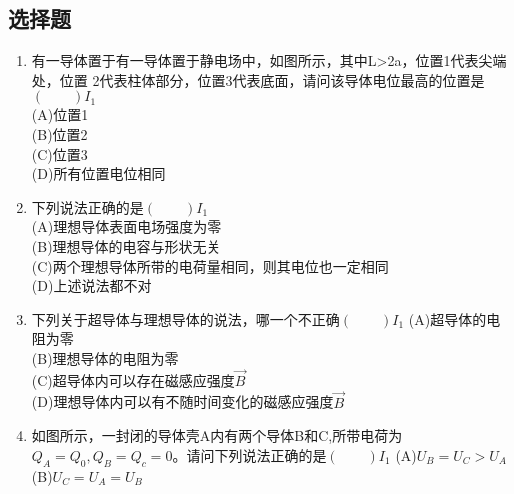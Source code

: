 \subsection{选择题}
\begin{enumerate}
\item 有一导体置于有一导体置于静电场中，如图所示，其中L>2a，位置1代表尖端处，位置 2代表柱体部分，位置3代表底面，请问该导体电位最高的位置是$(\qquad)I_1$\\
(A)位置1\\
(B)位置2\\
(C)位置3\\
(D)所有位置电位相同
\item 下列说法正确的是$(\qquad)I_1$\\
(A)理想导体表面电场强度为零\\
(B)理想导体的电容与形状无关\\
(C)两个理想导体所带的电荷量相同，则其电位也一定相同\\
(D)上述说法都不对
\item 下列关于超导体与理想导体的说法，哪一个不正确$(\qquad)I_1$
(A)超导体的电阻为零\\
(B)理想导体的电阻为零\\
(C)超导体内可以存在磁感应强度$\vec B$\\
(D)理想导体内可以有不随时间变化的磁感应强度$\vec B$
\item 如图所示，一封闭的导体壳A内有两个导体B和C,所带电荷为$Q_A=Q_0,Q_B=Q_c=0$。请问下列说法正确的是$(\qquad)I_1$
(A)$U_B=U_C>U_A$
(B)$U_C=U_A=U_B$
\end{enumerate}